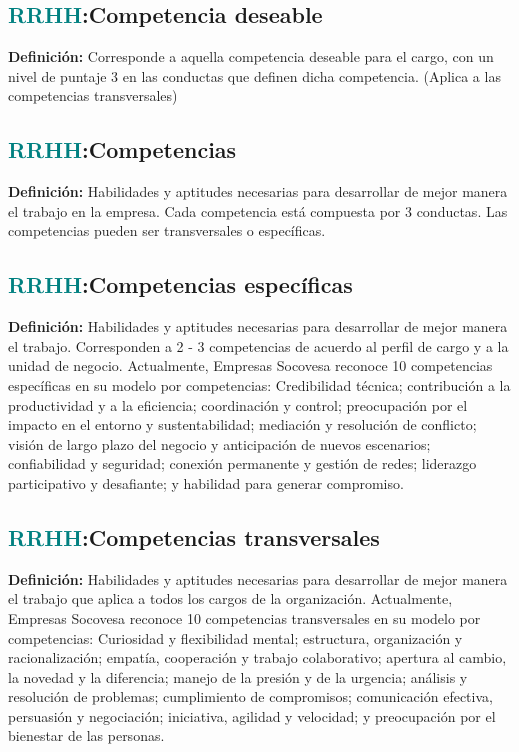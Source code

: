 \documentclass[12pt]{article}
\begin{document}
\subsection{\textcolor{teal}{RRHH}:{Competencia deseable}}
\textbf{Definición:} Corresponde a aquella competencia deseable para el cargo, con un nivel de puntaje 3 en las conductas que definen dicha competencia. (Aplica a las competencias transversales)
\subsection{\textcolor{teal}{RRHH}:{Competencias}}
\textbf{Definición:} Habilidades y aptitudes necesarias para desarrollar de mejor manera el trabajo en la empresa. Cada competencia está compuesta por 3 conductas. Las competencias pueden ser transversales o específicas.
\subsection{\textcolor{teal}{RRHH}:{Competencias específicas}}
\textbf{Definición:} Habilidades y aptitudes necesarias para desarrollar de mejor manera el trabajo. Corresponden a 2 - 3 competencias de acuerdo al perfil de cargo y a la unidad de negocio. Actualmente, Empresas Socovesa reconoce 10 competencias específicas en su modelo por competencias: Credibilidad técnica; contribución a la productividad y a la eficiencia; coordinación y control; preocupación por el impacto en el entorno y sustentabilidad; mediación y resolución de conflicto; visión de largo plazo del negocio y anticipación de nuevos escenarios; confiabilidad y seguridad; conexión permanente y gestión de redes; liderazgo participativo y desafiante; y habilidad para generar compromiso.
\subsection{\textcolor{teal}{RRHH}:{Competencias transversales}}
\textbf{Definición:} Habilidades y aptitudes necesarias para desarrollar de mejor manera el trabajo que aplica a todos los cargos de la organización. Actualmente, Empresas Socovesa reconoce 10 competencias transversales en su modelo por competencias: Curiosidad y flexibilidad mental; estructura, organización y racionalización; empatía, cooperación y trabajo colaborativo; apertura al cambio, la novedad y la diferencia; manejo de la presión y de la urgencia; análisis y resolución de problemas; cumplimiento de compromisos; comunicación efectiva, persuasión y negociación; iniciativa, agilidad y velocidad; y preocupación por el bienestar de las personas.
\end{document}
